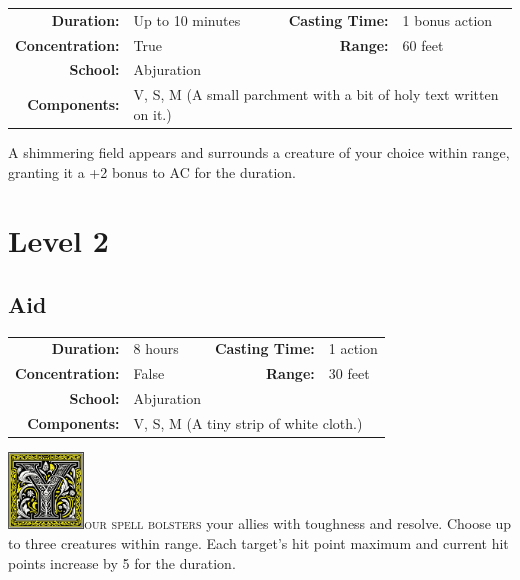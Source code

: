 \documentclass[12pt,showtrims]{memoir}
\begin{document}
{
\small\centering\vspace{-6pt}
\begin{tabular}{rlrl}
\toprule

\textbf{Duration:} & U{\scriptsize p to 10 minutes} &
\textbf{Casting Time:} & 1 {\scriptsize bonus action} \\
\textbf{Concentration:} & True &
\textbf{Range:} & 60 feet \\
\textbf{School:} & Abjuration \\
\textbf{Components:} & \multicolumn{3}{p{0.7\textwidth}}{V, S, M (A small parchment with a bit of holy text written on it.)}\\

\bottomrule
\end{tabular}
}

\vspace{1\baselineskip}\noindent A shimmering field appears and surrounds a creature of your choice within range, granting it a +2 bonus to AC for the duration.

\newpage
\chapter*{Level 2} 
\section*{Aid}

{
\small\centering\vspace{-6pt}
\begin{tabular}{rlrl}
\toprule

\textbf{Duration:} & 8 hours &
\textbf{Casting Time:} & 1 action \\
\textbf{Concentration:} & False &
\textbf{Range:} & 30 feet \\
\textbf{School:} & Abjuration \\
\textbf{Components:} & \multicolumn{3}{p{0.7\textwidth}}{V, S, M (A tiny strip of white cloth.)}\\

\bottomrule
\end{tabular}
}

\vspace{1\baselineskip}\noindent 
\lettrine[lines=4]{\includegraphics[height=58pt]{initials/Y.png}}{our spell bolsters} your allies with toughness and resolve. Choose up to three creatures within range. Each target's hit point maximum and current hit points increase by 5 for the duration.
\end{document}
